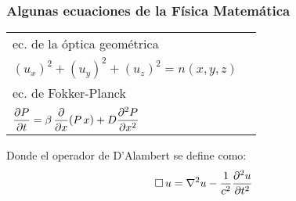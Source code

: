 \documentclass[12pt]{beamer}
\begin{document}
\begin{frame}
\frametitle{Algunas ecuaciones de la Física Matemática}
\begin{table}
\renewcommand{\arraystretch}{1.5}
\begin{tabular}{l@{\hskip 1cm} l@{\hskip 2cm}}
ec. de la óptica geométrica & \\
$(u_{x})^{2} + (u_{y})^{2} + (u_{z})^{2} =  n (x, y, z)$ &  \pause \\
ec. de Fokker-Planck & \\
$\displaystyle \pdv{P}{t} = \beta \, \displaystyle \pdv{x} (P \, x) +  D \displaystyle \pdv[2]{P}{x}$ & 
\end{tabular}
\end{table}
\pause
Donde el operador de D'Alambert se define como:
\begin{align*}
\square \, u = \laplacian{u} - \dfrac{1}{c^{2}} \pdv[2]{u}{t}
\end{align*}
\end{frame}
\end{document}
